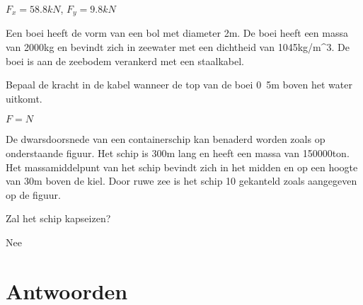	\begin{antwoord}
		$F_x = \unit{58.8}{kN}$, $F_y = \unit{9.8}{kN}$
	\end{antwoord}
	\begin{toepassing}
		\label{boei}
Een boei heeft de vorm van een bol met diameter \unit{2}{m}. De boei heeft een massa van \unit{2000}{kg} en bevindt zich in zeewater met een dichtheid van \unit{1045}{kg/m^3}. De boei is aan de zeebodem verankerd met een staalkabel.
		
Bepaal de kracht in de kabel wanneer de top van de boei \unit{0.5}{m} boven het water uitkomt.
		\begin{center}
			
		\end{center}
	\end{toepassing}
	\begin{antwoord}
		$F = \unit{}{N}$ 
	\end{antwoord}
	\begin{toepassing}
		\label{containerschip}
De dwarsdoorsnede van een containerschip kan benaderd worden zoals op onderstaande figuur. Het schip is \unit{300}{m} lang en heeft een massa van \unit{150000}{ton}. Het massamiddelpunt van het schip bevindt zich in het midden en op een hoogte van \unit{30}{m} boven de kiel. Door ruwe zee is het schip \unit{10}{\degree} gekanteld zoals aangegeven op de figuur.
		
		Zal het schip kapseizen?
		\begin{center}
			
		\end{center}
	\end{toepassing}
	\begin{antwoord}
		Nee
	\end{antwoord}
	
	\section*{Antwoorden}
	\begin{multicols}{2}
	\end{multicols}